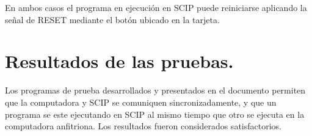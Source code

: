 En ambos casos el programa en ejecuci\'on en SCIP puede reiniciarse aplicando la se\~nal de %
RESET mediante el bot\'on ubicado en la tarjeta.


\section{Resultados de las pruebas.}
\label{Section:resultados}

Los programas de prueba desarrollados y presentados en el documento permiten que la computadora %
y SCIP se comuniquen sincronizadamente, y que un programa se este ejecutando en SCIP al mismo %
tiempo que otro se ejecuta en la computadora anfitriona. Los resultados fueron considerados %
satisfactorios.

